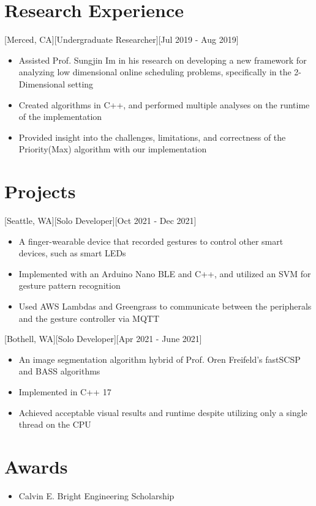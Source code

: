 \documentclass{article}
\begin{document}
\section{Research Experience}
[Merced, CA][Undergraduate Researcher][Jul 2019 - Aug 2019]
\begin{itemize}
  \item Assisted Prof. Sungjin Im in his research on developing a new framework for analyzing low dimensional online scheduling problems, specifically in the 2-Dimensional setting
  \item Created algorithms in C++, and performed multiple analyses on the runtime of the implementation
  \item Provided insight into the challenges, limitations, and correctness of the Priority(Max) algorithm with our implementation
\end{itemize}

\section{Projects}
[Seattle, WA][Solo Developer][Oct 2021 - Dec 2021]
\begin{itemize}
  \item A finger-wearable device that recorded gestures to control other smart devices, such as smart LEDs
  \item Implemented with an Arduino Nano BLE and C++, and utilized an SVM for gesture pattern recognition
  \item Used AWS Lambdas and Greengrass to communicate between the peripherals and the gesture controller via MQTT
\end{itemize}
[Bothell, WA][Solo Developer][Apr 2021 - June 2021]
\begin{itemize}
  \item An image segmentation algorithm hybrid of Prof. Oren Freifeld's fastSCSP and BASS algorithms
  \item Implemented in C++ 17
  \item Achieved acceptable visual results and runtime despite utilizing only a single thread on the CPU
\end{itemize}
\section{Awards}
\begin{itemize}
  \item Calvin E. Bright Engineering Scholarship
\end{itemize}
\end{document}
